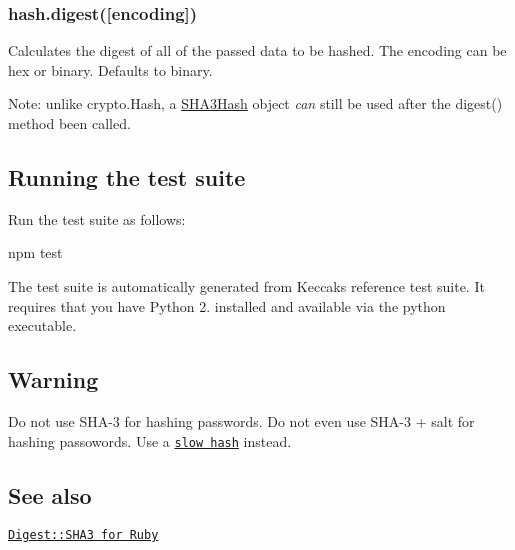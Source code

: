 \subsubsection*{hash.\+digest(\mbox{[}encoding\mbox{]})}

Calculates the digest of all of the passed data to be hashed. The encoding can be {\ttfamily \textquotesingle{}hex\textquotesingle{}} or {\ttfamily \textquotesingle{}binary\textquotesingle{}}. Defaults to {\ttfamily \textquotesingle{}binary\textquotesingle{}}.

Note\+: unlike {\ttfamily crypto.\+Hash}, a {\ttfamily \hyperlink{class_s_h_a3_hash}{S\+H\+A3\+Hash}} object {\itshape can} still be used after the {\ttfamily digest()} method been called.

\subsection*{Running the test suite}

Run the test suite as follows\+: \begin{DoxyVerb}npm test
\end{DoxyVerb}


The test suite is automatically generated from Keccak\textquotesingle{}s reference test suite. It requires that you have Python 2. installed and available via the {\ttfamily python} executable.

\subsection*{Warning}

Do not use S\+H\+A-\/3 for hashing passwords. Do not even use S\+H\+A-\/3 + salt for hashing passowords. Use a \href{http://codahale.com/how-to-safely-store-a-password/}{\tt slow hash} instead.

\subsection*{See also}

\href{https://github.com/phusion/digest-sha3-ruby}{\tt Digest\+::\+S\+H\+A3 for Ruby} 